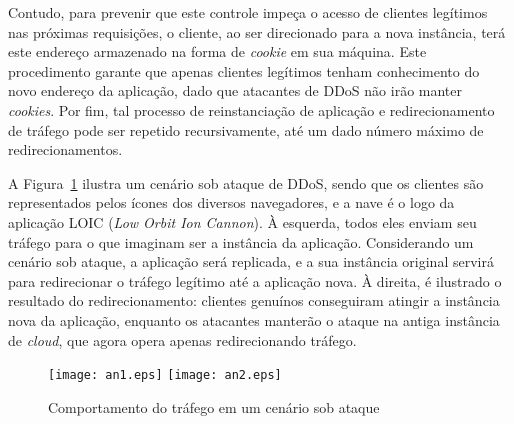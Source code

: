Contudo, para prevenir que este controle impeça o acesso de clientes legítimos nas próximas requisições, o cliente, ao ser direcionado para a nova instância, terá este endereço armazenado na forma de \emph{cookie} em sua máquina. Este procedimento garante que apenas clientes legítimos tenham conhecimento do novo endereço da aplicação, dado que atacantes de DDoS não irão manter \emph{cookies}. Por fim,  tal processo de reinstanciação de aplicação e redirecionamento de tráfego pode ser repetido recursivamente, até um dado número máximo de redirecionamentos.

A Figura~\ref{fig:cen} ilustra um cenário sob ataque de DDoS, sendo que os clientes são representados pelos ícones dos diversos navegadores, e a nave é o logo da aplicação LOIC (\emph{Low Orbit Ion Cannon}). À esquerda, todos eles enviam seu tráfego para o que imaginam ser a instância da aplicação. Considerando um cenário sob ataque, a aplicação será replicada, e a sua instância original servirá para redirecionar o tráfego legítimo até a aplicação nova. À direita, é ilustrado o resultado do redirecionamento: clientes genuínos conseguiram atingir a instância nova da aplicação, enquanto os atacantes manterão o ataque na antiga instância de \emph{cloud}, que agora opera apenas redirecionando tráfego.


\begin{figure}[t!]
	\centering
	\texttt{[image: an1.eps]}
	\hskip 1cm
	\texttt{[image: an2.eps]}
	\caption{Comportamento do tráfego em um cenário sob ataque}
	\label{fig:cen}
\end{figure}